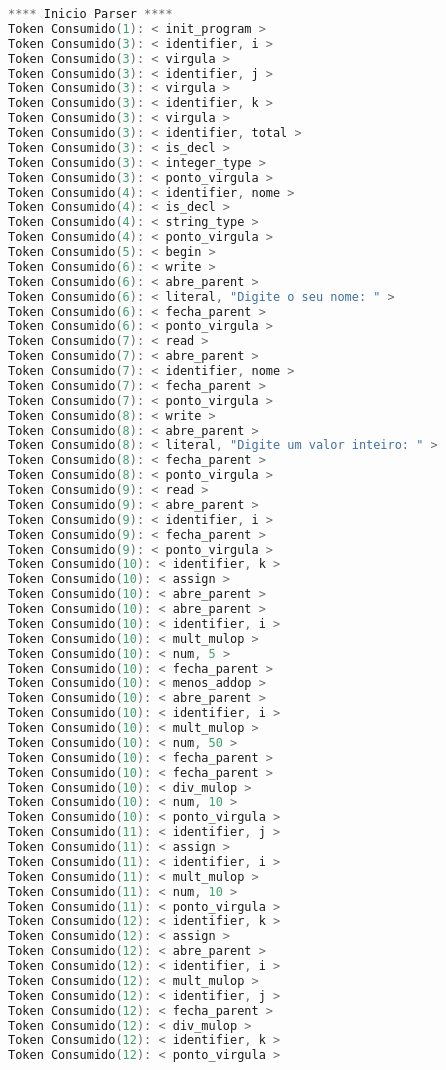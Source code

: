 \begin{lstlisting}[caption={Saida Correta para o Codigo de teste  : Teste4.txt},label={Entrada 1},language=C]
**** Inicio Parser ****
Token Consumido(1): < init_program >
Token Consumido(3): < identifier, i >
Token Consumido(3): < virgula >
Token Consumido(3): < identifier, j >
Token Consumido(3): < virgula >
Token Consumido(3): < identifier, k >
Token Consumido(3): < virgula >
Token Consumido(3): < identifier, total >
Token Consumido(3): < is_decl >
Token Consumido(3): < integer_type >
Token Consumido(3): < ponto_virgula >
Token Consumido(4): < identifier, nome >
Token Consumido(4): < is_decl >
Token Consumido(4): < string_type >
Token Consumido(4): < ponto_virgula >
Token Consumido(5): < begin >
Token Consumido(6): < write >
Token Consumido(6): < abre_parent >
Token Consumido(6): < literal, "Digite o seu nome: " >
Token Consumido(6): < fecha_parent >
Token Consumido(6): < ponto_virgula >
Token Consumido(7): < read >
Token Consumido(7): < abre_parent >
Token Consumido(7): < identifier, nome >
Token Consumido(7): < fecha_parent >
Token Consumido(7): < ponto_virgula >
Token Consumido(8): < write >
Token Consumido(8): < abre_parent >
Token Consumido(8): < literal, "Digite um valor inteiro: " >
Token Consumido(8): < fecha_parent >
Token Consumido(8): < ponto_virgula >
Token Consumido(9): < read >
Token Consumido(9): < abre_parent >
Token Consumido(9): < identifier, i >
Token Consumido(9): < fecha_parent >
Token Consumido(9): < ponto_virgula >
Token Consumido(10): < identifier, k >
Token Consumido(10): < assign >
Token Consumido(10): < abre_parent >
Token Consumido(10): < abre_parent >
Token Consumido(10): < identifier, i >
Token Consumido(10): < mult_mulop >
Token Consumido(10): < num, 5 >
Token Consumido(10): < fecha_parent >
Token Consumido(10): < menos_addop >
Token Consumido(10): < abre_parent >
Token Consumido(10): < identifier, i >
Token Consumido(10): < mult_mulop >
Token Consumido(10): < num, 50 >
Token Consumido(10): < fecha_parent >
Token Consumido(10): < fecha_parent >
Token Consumido(10): < div_mulop >
Token Consumido(10): < num, 10 >
Token Consumido(10): < ponto_virgula >
Token Consumido(11): < identifier, j >
Token Consumido(11): < assign >
Token Consumido(11): < identifier, i >
Token Consumido(11): < mult_mulop >
Token Consumido(11): < num, 10 >
Token Consumido(11): < ponto_virgula >
Token Consumido(12): < identifier, k >
Token Consumido(12): < assign >
Token Consumido(12): < abre_parent >
Token Consumido(12): < identifier, i >
Token Consumido(12): < mult_mulop >
Token Consumido(12): < identifier, j >
Token Consumido(12): < fecha_parent >
Token Consumido(12): < div_mulop >
Token Consumido(12): < identifier, k >
Token Consumido(12): < ponto_virgula >

\end{lstlisting}
